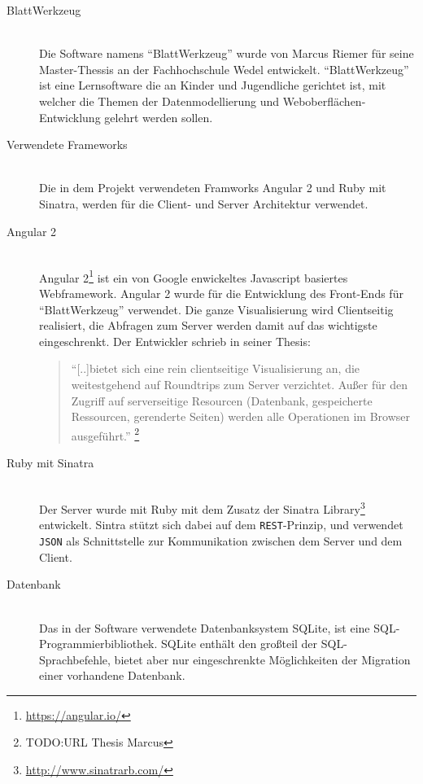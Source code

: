 \begin{description}
\item[BlattWerkzeug] \hfill\\
Die Software namens ``BlattWerkzeug'' wurde von Marcus Riemer für seine Master-Thessis an der Fachhochschule Wedel entwickelt. ``BlattWerkzeug'' ist eine Lernsoftware die an Kinder und Jugendliche gerichtet ist, mit welcher die Themen der Datenmodellierung und Weboberflächen-Entwicklung gelehrt werden sollen.

\item[Verwendete Frameworks] \hfill\\
Die in dem Projekt verwendeten Framworks Angular 2 und Ruby mit Sinatra, werden für die Client- und Server Architektur verwendet.

\item[Angular 2] \hfill\\
Angular 2\footnote{\url{https://angular.io/}}  ist ein von Google enwickeltes Javascript basiertes Webframework. Angular 2 wurde für die Entwicklung des Front-Ends für ``BlattWerkzeug'' verwendet. Die ganze Visualisierung wird Clientseitig realisiert, die Abfragen zum Server werden damit auf das wichtigste eingeschrenkt. Der Entwickler schrieb in seiner Thesis: 
\begin{quote}
``[..]bietet sich eine rein clientseitige Visualisierung an, die weitestgehend auf Roundtrips zum Server verzichtet. Außer für den Zugriff auf serverseitige Resourcen (Datenbank, gespeicherte Ressourcen, gerenderte Seiten) werden alle Operationen im Browser ausgeführt.'' \footnote{TODO:URL Thesis Marcus}%
\end{quote} 

\item[Ruby mit Sinatra] \hfill\\
Der Server wurde mit Ruby mit dem Zusatz der Sinatra Library\footnote{\url{http://www.sinatrarb.com/}} entwickelt. Sintra stützt sich dabei auf dem \texttt{REST}-Prinzip, und verwendet \texttt{JSON} als Schnittstelle zur Kommunikation zwischen dem Server und dem Client.

\item[Datenbank] \hfill\\
Das in der Software verwendete Datenbanksystem SQLite, ist eine SQL-Programmierbibliothek. SQLite enthält den großteil der SQL-Sprachbefehle, bietet aber nur eingeschrenkte Möglichkeiten der Migration einer vorhandene Datenbank.

\end{description}


